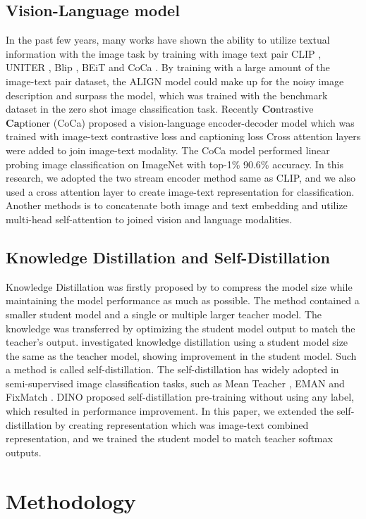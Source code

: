 \documentclass[10pt,twocolumn,letterpaper]{article}
\begin{document}
\subsection{Vision-Language model}
In the past few years, many works have shown the ability to utilize textual information with the image task by training with image text pair \eg CLIP \cite{clip}, UNITER \cite{uniter}, Blip \cite{blip-1,blip-2}, BEiT \cite{beit-3} and CoCa \cite{coca}.
By training with a large amount of the image-text pair dataset, the ALIGN model could make up for the noisy image description and surpass the model, which was trained with the benchmark dataset in the zero shot image classification task.
Recently \textbf{Co}ntrastive \textbf{Ca}ptioner (CoCa) \cite{coca} proposed a vision-language encoder-decoder model which was trained with image-text contrastive loss and captioning loss
Cross attention layers were added to join image-text modality.
The CoCa model performed linear probing image classification on ImageNet with top-1\% 90.6\% accuracy.
In this research, we adopted the two stream encoder method same as CLIP, and we also used a cross attention layer to create image-text representation for classification.
Another methods \cite{uniter,beit-3,uniter,vlmo} is to concatenate both image and text embedding and utilize multi-head self-attention to joined vision and language modalities.

\subsection{Knowledge Distillation and Self-Distillation}
Knowledge Distillation was firstly proposed by \cite{knowledge_distill} to compress the model size while maintaining the model performance as much as possible.
The method contained a smaller student model and a single or multiple larger teacher model.
The knowledge was transferred by optimizing the student model output to match the teacher's output.
\cite{born_again} investigated knowledge distillation using a student model size the same as the teacher model, showing improvement in the student model.
Such a method is called self-distillation.
The self-distillation has widely adopted in semi-supervised image classification tasks, such as Mean Teacher \cite{mean_teacher}, EMAN \cite{eman} and FixMatch \cite{fixmatch}.
DINO \cite{dino} proposed self-distillation pre-training without using any label, which resulted in performance improvement.
In this paper, we extended the self-distillation by creating representation which was image-text combined representation, and we trained the student model to match teacher softmax outputs.

\section{Methodology}


{\small


}
\end{document}

